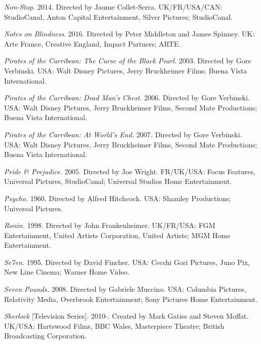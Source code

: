 \medskip\noindent\textit{Non-Stop}. 2014. Directed by Jaume Collet-Serra. UK/FR/USA/CAN: StudioCanal, Anton Capital Entertainment, Silver Pictures; StudioCanal.



\medskip\noindent\textit{Notes on Blindness}. 2016. Directed by Peter Middleton and James Spinney. UK: Arte France, Creative England, Impact Partners; ARTE.



\medskip\noindent\textit{Pirates of the Carribean: The Curse of the Black Pearl.} 2003. Directed by Gore Verbinski. USA: Walt Disney Pictures, Jerry Bruckheimer Films; Buena Vista International.



\medskip\noindent\textit{Pirates of the Carribean: Dead Man’s Chest.} 2006. Directed by Gore Verbinski. USA: Walt Disney Pictures, Jerry Bruckheimer Films, Second Mate Productions; Buena Vista International.



\medskip\noindent\textit{Pirates of the Carribean: At World’s End.} 2007. Directed by Gore Verbinski. USA: Walt Disney Pictures, Jerry Bruckheimer Films, Second Mate Productions; Buena Vista International.



\medskip\noindent\textit{Pride \& Prejudice.} 2005. Directed by Joe Wright. FR/UK/USA: Focus Features, Universal Pictures, StudioCanal; Universal Studios Home Entertainment.



\medskip\noindent\textit{Psycho.} 1960. Directed by Alfred Hitchcock. USA: Shamley Productions; Universal Pictures.



\medskip\noindent\textit{Ronin.} 1998. Directed by John Frankenheimer. UK/FR/USA: FGM Entertainment, United Artists Corporation, United Artists; MGM Home Entertainment.



\medskip\noindent\textit{Se7en.} 1995. Directed by David Fincher. USA: Cecchi Gori Pictures, Juno Pix, New Line Cinema; Warner Home Video.



\medskip\noindent\textit{Seven Pounds.} 2008. Directed by Gabriele Muccino. USA: Columbia Pictures, Relativity Media, Overbrook Entertainment; Sony Pictures Home Entertainment.



\medskip\noindent\textit{Sherlock} [Television Series]. 2010-. Created by Mark Gatiss and Steven Moffat. UK/USA: Hartswood Films, BBC Wales, Masterpiece Theatre; British Broadcasting Corporation.



